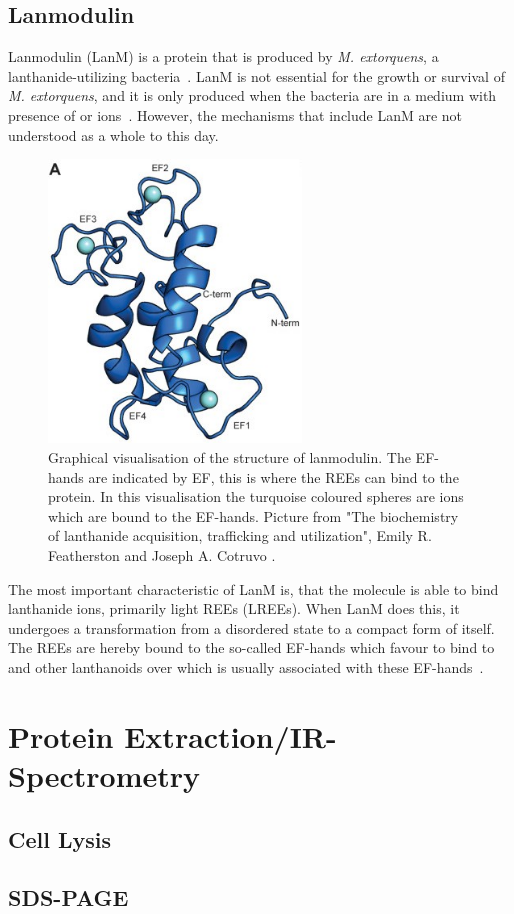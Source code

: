 \subsection{Lanmodulin\authorA}

Lanmodulin (LanM) is a protein that is produced by \textit{M. extorquens}, a lanthanide-utilizing bacteria~\cite{lanmdiscovery}.
LanM is not essential for the growth or survival of \textit{M. extorquens}, and it is only produced when the bacteria are in a medium with presence of  or  ions~\cite{lanmroleinbiology}.
However, the mechanisms that include LanM are not understood as a whole to this day.

\begin{figure}[H]
    \centering
    \includegraphics[width=0.6\textwidth]{./media/images/lanm_structure}
    \caption{Graphical visualisation of the structure of lanmodulin. The EF-hands are indicated by EF, this is where the REEs can bind to the protein. In this visualisation the turquoise coloured spheres are  ions which are bound to the EF-hands. Picture from "The biochemistry of lanthanide acquisition, trafficking and utilization", Emily R. Featherston and Joseph A. Cotruvo \cite{lanmroleinbiology}.}
    \label{fig:lanm_structure}
\end{figure}

The most important characteristic of LanM is, that the molecule is able to bind lanthanide ions, primarily light REEs (LREEs).
When LanM does this, it undergoes a transformation from a disordered state to a compact form of itself.
The REEs are hereby bound to the so-called EF-hands which favour to bind to  and other lanthanoids over  which is usually associated with these EF-hands~\cite{lanmstructure}.


\section{Protein Extraction/IR-Spectrometry\authorB{}}


\subsection{Cell Lysis}

\subsection{SDS-PAGE}
